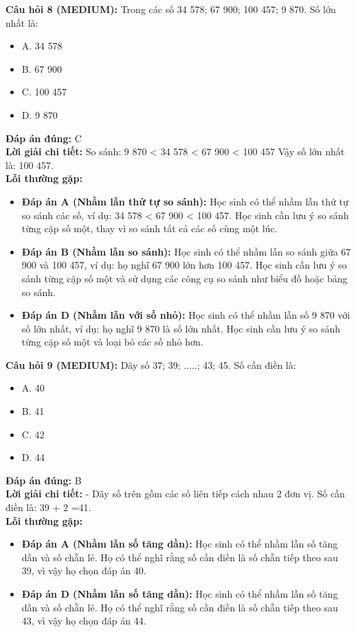 \documentclass{article}
\begin{document}
\begin{minipage}{\textwidth}
\noindent\textbf{Câu hỏi 8 (MEDIUM):} Trong các số 34 578; 67 900; 100 457; 9 870. Số lớn nhất là: 
\begin{itemize}[label={}]
    \item A. 34 578
    \item B. 67 900
    \item C. 100 457
    \item D. 9 870
\end{itemize}
\textbf{Đáp án đúng:} C \\
\textbf{Lời giải chi tiết:} So sánh: 9 870 < 34 578 < 67 900 < 100 457 Vậy số lớn nhất là: 100 457. \\
\textbf{Lỗi thường gặp:}
\begin{itemize}
  \item \textbf{Đáp án A (Nhầm lẫn thứ tự so sánh):} Học sinh có thể nhầm lẫn thứ tự so sánh các số, ví dụ: 34 578 < 67 900 < 100 457. Học sinh cần lưu ý so sánh từng cặp số một, thay vì so sánh tất cả các số cùng một lúc.
  \item \textbf{Đáp án B (Nhầm lẫn so sánh):} Học sinh có thể nhầm lẫn so sánh giữa 67 900 và 100 457, ví dụ: họ nghĩ 67 900 lớn hơn 100 457. Học sinh cần lưu ý so sánh từng cặp số một và sử dụng các công cụ so sánh như biểu đồ hoặc bảng so sánh.
  \item \textbf{Đáp án D (Nhầm lẫn với số nhỏ):} Học sinh có thể nhầm lẫn số 9 870 với số lớn nhất, ví dụ: họ nghĩ 9 870 là số lớn nhất. Học sinh cần lưu ý so sánh từng cặp số một và loại bỏ các số nhỏ hơn.
\end{itemize}
\end{minipage}
\vspace{1em}

\begin{minipage}{\textwidth}
\noindent\textbf{Câu hỏi 9 (MEDIUM):} Dãy số 37; 39; .....; 43; 45. Số cần điền là: 
\begin{itemize}[label={}]
    \item A. 40
    \item B. 41
    \item C. 42
    \item D. 44
\end{itemize}
\textbf{Đáp án đúng:} B \\
\textbf{Lời giải chi tiết:} - Dãy số trên gồm các số liên tiếp cách nhau 2 đơn vị. Số cần điền là: 39 + 2 =41. \\
\textbf{Lỗi thường gặp:}
\begin{itemize}
  \item \textbf{Đáp án A (Nhầm lẫn số tăng dần):} Học sinh có thể nhầm lẫn số tăng dần và số chẵn lẻ. Họ có thể nghĩ rằng số cần điền là số chẵn tiếp theo sau 39, vì vậy họ chọn đáp án 40.
  \item \textbf{Đáp án D (Nhầm lẫn số tăng dần):} Học sinh có thể nhầm lẫn số tăng dần và số chẵn lẻ. Họ có thể nghĩ rằng số cần điền là số chẵn tiếp theo sau 43, vì vậy họ chọn đáp án 44.
\end{itemize}
\end{minipage}
\vspace{1em}
\end{document}
